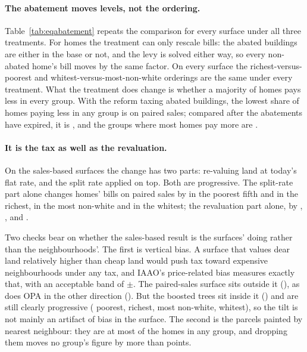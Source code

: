 \documentclass[11pt]{article}
\begin{document}
\paragraph{The abatement moves levels, not the ordering.} Table~\ref{tab:eqabatement} repeats the
comparison for every surface under all three treatments. For homes the treatment can only
rescale bills: the abated buildings are either in the base or not, and the levy is solved either
way, so every non-abated home's bill moves by the same factor. On every surface
the richest-versus-poorest and whitest-versus-most-non-white orderings are the same under every
treatment. What the treatment does change is whether a majority of homes pays less in every
group. With the reform taxing abated buildings, the lowest share of homes paying less in any
group is \LycdEqSfiveEndsMinWin{} on paired sales; compared after the abatements have expired, it
is \LycdEqSfiveExpiredMinWin{}, and the groups where most homes pay more are
\LycdEqSfiveExpiredLosingGroups{}.

\paragraph{It is the tax as well as the revaluation.} On the sales-based surfaces the change has
two parts: re-valuing land at today's flat rate, and the split rate applied on top. Both are
progressive. The split-rate part alone changes homes' bills on paired sales by
\LycdEqSfiveSplitHomesPoor{} in the poorest fifth and \LycdEqSfiveSplitHomesRich{} in the richest,
\LycdEqSfiveSplitHomesNonwhite{} in the most non-white and \LycdEqSfiveSplitHomesWhite{} in the
whitest; the revaluation part alone, by \LycdEqSfiveRevalHomesPoor{},
\LycdEqSfiveRevalHomesRich{}, \LycdEqSfiveRevalHomesNonwhite{} and
\LycdEqSfiveRevalHomesWhite{}.

Two checks bear on whether the sales-based result is the surfaces' doing rather than the
neighbourhoods'. The first is vertical bias. A surface that values dear land relatively higher
than cheap land would push tax toward expensive neighbourhoods under any tax, and IAAO's
price-related bias measures exactly that, with an acceptable band of $\pm$\LycdIaaoPrbBand{}. The
paired-sales surface sits outside it (\LycdSfivePrb{}), as does OPA in the other direction
(\LycdSzeroPrb{}). But the boosted trees sit inside it (\LycdEgbmPrb{}) and are still clearly
progressive (\LycdEqEgbmEndsHomesPoor{} poorest, \LycdEqEgbmEndsHomesRich{} richest,
\LycdEqEgbmEndsHomesNonwhite{} most non-white, \LycdEqEgbmEndsHomesWhite{} whitest), so the tilt is
not mainly an artifact of bias in the surface. The second is the parcels painted by nearest
neighbour: they are at most \LycdEqKnnMaxSharePct{} of the homes in any group, and dropping them
moves no group's figure by more than \LycdEqKnnMaxShift{} points.
\end{document}

